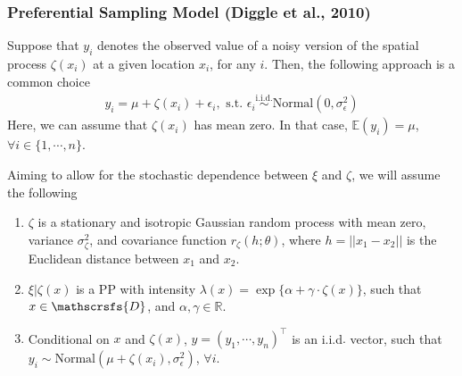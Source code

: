 \documentclass[10pt, aspectratio = 169, handout]{beamer} %
\begin{document}
	
	  \begin{frame}[t]
		\frametitle{Preferential Sampling Model (Diggle et al., 2010)}
		\justifying

       Suppose that $y_i$ denotes the observed value of a noisy version of the spatial process $\zeta(x_i)$ at a given location $x_i$, for any $i$. Then, the following approach is a common choice
        \begin{align*} 
        	y_i = \mu + \zeta(x_i) + \epsilon_i, \text{ s.t. } \epsilon_i \overset{\text{i.i.d.}}{\sim} \text{Normal}(0, \sigma^2_{\epsilon}) 
        \end{align*}
        Here, we can assume that $\zeta(x_i)$ has mean zero. In that case, $\mathbb{E}(y_i) = \mu$, $\forall i \in \{1, \cdots, n\}$. \vspace{12pt}

        \pause

        Aiming to allow for the stochastic dependence between $\xi$ and $\zeta$, we will assume the following \vspace{-12pt}
        \begin{enumerate} \justifying
        	\item $\zeta$ is a stationary and isotropic Gaussian random process with mean zero, variance $\sigma^2_{\zeta}$, and covariance function $r_{\zeta}(h; \theta)$, where $h = ||x_1 - x_2||$ is the Euclidean distance between $x_1$ and $x_2$. \pause
        	\item $\xi|\zeta(x)$ is a PP with intensity $\lambda(x) = \exp\{\alpha + \gamma \cdot \zeta(x)\}$, such that $x \in \mathscrsfs{D}$, and $\alpha, \gamma \in \mathbb{R}$. \pause
        	\item Conditional on $x$ and $\zeta(x)$, $y = (y_1, \cdots, y_n)^{\top}$ is an i.i.d$.$ vector, such that $y_i \sim \text{Normal}(\mu + \zeta(x_i), \sigma^2_{\epsilon})$, $\forall i$.
        \end{enumerate}
	\end{frame}
\end{document}
